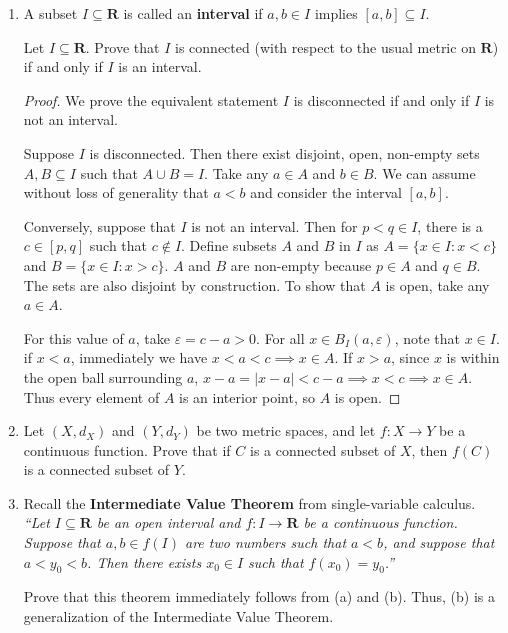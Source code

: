\documentclass{article}
\newcommand{\R}{\mathbf{R}}
\theoremstyle{plain} %
\numberwithin{thm}{section} %
\theoremstyle{definition}
\begin{document}
    \begin{enumerate}[label=(\alph*)]
        \item A subset $I\subseteq \R$ is called an \textbf{interval} if $a,b\in I$ implies $[a,b]\subseteq I$.

        Let $I\subseteq \R$. Prove that $I$ is connected (with respect to the usual metric on $\R$) if and only if $I$ is an interval.
        
        \begin{proof}
            We prove the equivalent statement \(I\) is disconnected if and only if \(I\) is not an interval.

            Suppose \(I\) is disconnected. Then there exist disjoint, open, non-empty sets \(A,B \subseteq I\) such that \(A \cup B = I\). Take any \(a \in A\) and \(b \in B\). We can assume without loss of generality that \(a<b\) and consider the interval \([a,b]\).

            Conversely, suppose that \(I\) is not an interval. Then for \(p<q \in I\), there is a \(c \in [p,q]\) such that \(c \notin I\). Define subsets \(A\) and \(B\) in \(I\) as \(A = \{x\in I \colon x < c\}\) and \(B = \{x\in I \colon x > c\}\). \(A\) and \(B\) are non-empty because \(p \in A\) and \(q \in B\). The sets are also disjoint by construction. To show that \(A\) is open, take any \(a \in A\).
            
            For this value of \(a\), take \(\varepsilon = c - a > 0\). For all \(x \in B_I(a, \varepsilon)\), note that \(x \in I\). if \(x < a\), immediately we have \(x < a < c \implies x \in A\). If \(x >a\), since \(x\) is within the open ball surrounding \(a\), \(x-a = |x-a| < c-a \implies x<c \implies x\in A\). Thus every element of \(A\) is an interior point, so \(A\) is open.

        \end{proof}

        \item Let $(X,d_X)$ and $(Y,d_Y)$ be two metric spaces, and let $f:X\rightarrow Y$ be a continuous function. Prove that if $C$ is a connected subset of $X$, then $f(C)$ is a connected subset of $Y$.
        
        \item Recall the \textbf{Intermediate Value Theorem} from single-variable calculus. \textit{``Let $I\subseteq \R$ be an open interval and $f:I\rightarrow \R$ be a continuous function. Suppose that $a,b\in f(I)$ are two numbers such that $a<b$, and suppose that $a<y_0<b$. Then there exists $x_0\in I$ such that $f(x_0)=y_0$.''}

        Prove that this theorem immediately follows from (a) and (b). Thus, (b) is a generalization of the Intermediate Value Theorem.
    \end{enumerate}
\end{document}
